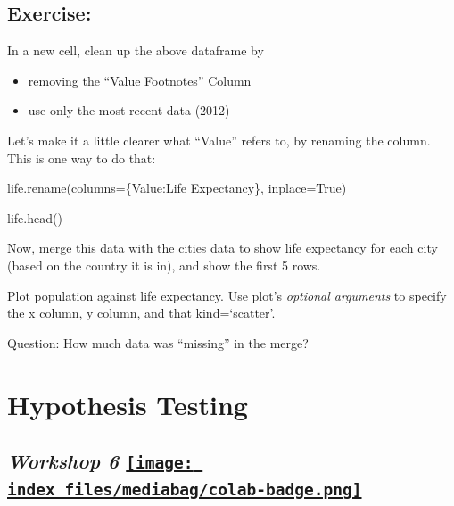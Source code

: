 \documentclass[
  letterpaper,
  DIV=11,
  numbers=noendperiod]{scrreprt}
\newenvironment{Shaded}{\begin{snugshade}}{\end{snugshade}}
\newcommand{\NormalTok}[1]{\textcolor[rgb]{0.00,0.23,0.31}{#1}}
\newcommand{\OperatorTok}[1]{\textcolor[rgb]{0.37,0.37,0.37}{#1}}
\newcommand{\StringTok}[1]{\textcolor[rgb]{0.13,0.47,0.30}{#1}}
\newcommand{\VariableTok}[1]{\textcolor[rgb]{0.07,0.07,0.07}{#1}}
\providecommand{\tightlist}{%
  \setlength{\itemsep}{0pt}\setlength{\parskip}{0pt}}\usepackage{longtable,booktabs,array}
\begin{document}
\hypertarget{exercise-20}{%
\section{Exercise:}\label{exercise-20}}

In a new cell, clean up the above dataframe by

\begin{itemize}
\tightlist
\item
  removing the ``Value Footnotes'' Column
\item
  use only the most recent data (2012)
\end{itemize}

Let's make it a little clearer what ``Value'' refers to, by renaming the
column. This is one way to do that:

\begin{Shaded}
\begin{Highlighting}[]
\NormalTok{life.rename(columns}\OperatorTok{=}\NormalTok{\{}\StringTok{\textquotesingle{}Value\textquotesingle{}}\NormalTok{:}\StringTok{\textquotesingle{}Life Expectancy\textquotesingle{}}\NormalTok{\}, inplace}\OperatorTok{=}\VariableTok{True}\NormalTok{)}
\end{Highlighting}
\end{Shaded}

\begin{Shaded}
\begin{Highlighting}[]
\NormalTok{life.head()}
\end{Highlighting}
\end{Shaded}

Now, merge this data with the cities data to show life expectancy for
each city (based on the country it is in), and show the first 5 rows.

Plot population against life expectancy. Use plot's \emph{optional
arguments} to specify the x column, y column, and that kind=`scatter'.

Question: How much data was ``missing'' in the merge?


\hypertarget{hypothesis-testing}{%
\chapter{Hypothesis Testing}\label{hypothesis-testing}}

\hypertarget{workshop-6-open-in-colab}{%
\section[\emph{Workshop 6} ]{\texorpdfstring{\emph{Workshop 6}
\href{https://colab.research.google.com/github/oballinger/QM2/blob/main/notebooks/W06.\%20Hypothesis\%20Testing.ipynb}{\protect\texttt{[image: index\_files/mediabag/colab-badge.png]}}}{Workshop 6 Open In Colab}}\label{workshop-6-open-in-colab}}
\end{document}
